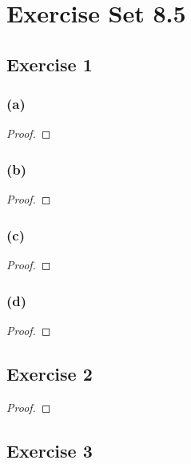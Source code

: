 \documentclass[14pt]{extarticle}
\begin{document}
\section{Exercise Set 8.5}

\subsection{Exercise 1}

\subsubsection{(a)}

\begin{proof}

\end{proof}

\subsubsection{(b)}

\begin{proof}

\end{proof}

\subsubsection{(c)}

\begin{proof}

\end{proof}

\subsubsection{(d)}

\begin{proof}

\end{proof}

\subsection{Exercise 2}

\begin{proof}

\end{proof}

\subsection{Exercise 3}
\end{document}
